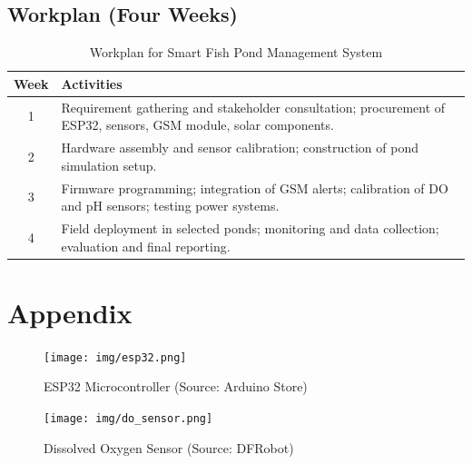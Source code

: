 \documentclass[12pt,a4paper]{report}
\begin{document}
\section{Workplan (Four Weeks)}
\begin{table}[H]
\centering
\renewcommand{\arraystretch}{1.3}
\begin{tabular}{|c|p{11cm}|}
\hline
\textbf{Week} & \textbf{Activities} \\
\hline
1 & Requirement gathering and stakeholder consultation; procurement of ESP32, sensors, GSM module, solar components. \\
\hline
2 & Hardware assembly and sensor calibration; construction of pond simulation setup. \\
\hline
3 & Firmware programming; integration of GSM alerts; calibration of DO and pH sensors; testing power systems. \\
\hline
4 & Field deployment in selected ponds; monitoring and data collection; evaluation and final reporting. \\
\hline
\end{tabular}
\caption{Workplan for Smart Fish Pond Management System}
\end{table}

\renewcommand{\bibname}{References}



\appendix
\chapter*{Appendix}

\begin{figure}[H]
    \centering
    \texttt{[image: img/esp32.png]}
    \caption{ESP32 Microcontroller (Source: Arduino Store)}
\end{figure}

\begin{figure}[H]
    \centering
    \texttt{[image: img/do\_sensor.png]}
    \caption{Dissolved Oxygen Sensor (Source: DFRobot)}
\end{figure}
\end{document}
